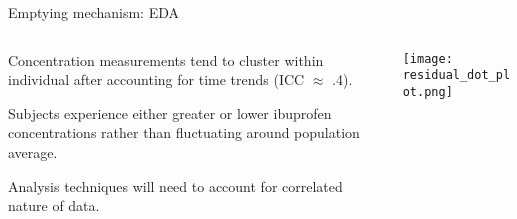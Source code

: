 \documentclass[]{beamer}
\begin{document}
\begin{frame}{Emptying mechanism: EDA}
\begin{columns}
\begin{column}{.4\textwidth}
\small
Concentration measurements tend to cluster within individual after accounting for time trends (ICC $\approx$ .4). 

\bigskip

Subjects experience either greater or lower ibuprofen concentrations rather than fluctuating around population average.

\bigskip

Analysis techniques will need to account for correlated nature of data.

\end{column}
\begin{column}{.6\textwidth}
\texttt{[image: residual\_dot\_plot.png]}
\end{column}
\end{columns}

\end{frame}
\end{document}
